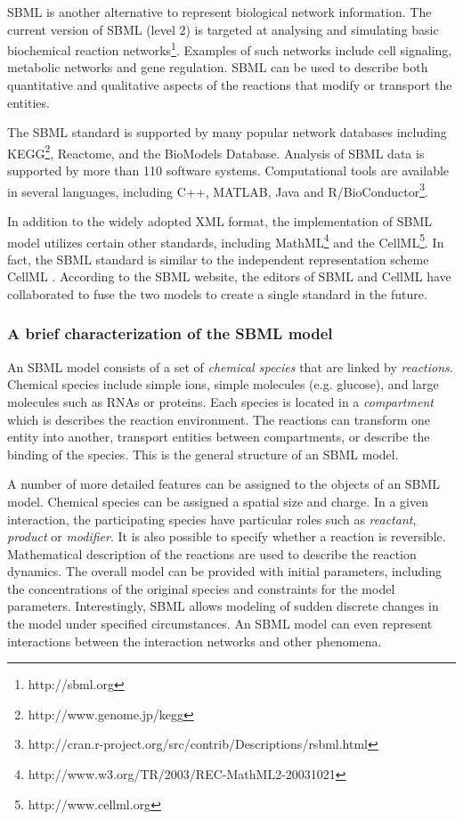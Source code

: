 \documentclass[a4paper,10pt,titlepage]{article}
\begin{document}
SBML is another alternative to represent biological network information. The current version of SBML \cite{Hucka03} (level 2) is targeted at analysing and simulating basic biochemical reaction networks\footnote{http://sbml.org}. Examples of such networks include cell signaling, metabolic networks and gene regulation. SBML can be used to describe both quantitative and qualitative aspects of the reactions that modify or transport the entities. 

The SBML standard is supported by many popular network databases including KEGG\footnote{http://www.genome.jp/kegg}, Reactome, and the BioModels Database. Analysis of SBML data is supported by more than 110 software systems. Computational tools are available in several languages, including C++, MATLAB, Java and R/BioConductor\footnote{http://cran.r-project.org/src/contrib/Descriptions/rsbml.html}. 

In addition to the widely adopted XML format, the implementation of SBML model utilizes certain other standards, including MathML\footnote{http://www.w3.org/TR/2003/REC-MathML2-20031021} and the CellML\footnote{http://www.cellml.org}. In fact, the SBML standard is similar to the independent representation scheme CellML \cite{Lloyd04}. According to the SBML website, the editors of SBML and CellML have collaborated to fuse the two models to create a single standard in the future. 

\subsubsection{A brief characterization of the SBML model}

An SBML model consists of a set of {\it chemical species} that are linked by {\it reactions}. Chemical species include simple ions, simple molecules  (e.g. glucose), and large molecules such as RNAs or proteins. Each species is located in a {\it compartment} which is describes the reaction environment. The reactions can transform one entity into another, transport entities between compartments, or describe the binding of the species.
This is the general structure of an SBML model.

A number of more detailed features can be assigned to the objects of an SBML model. Chemical species can be assigned a spatial size and charge. In a given interaction, the participating species have particular roles such as {\it reactant}, {\it product} or {\it modifier}. It is also possible to specify whether a reaction is reversible. Mathematical description of the reactions are used to describe the reaction dynamics. The overall model can be provided with initial parameters, including the concentrations of the original species and constraints for the model parameters. Interestingly, SBML allows modeling of sudden discrete changes in the model under specified circumstances. An SBML model can even represent interactions between the interaction networks and other phenomena. 
\end{document}
